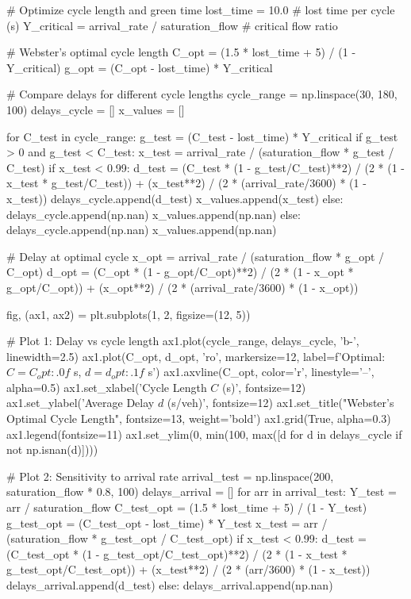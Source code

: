 \documentclass[11pt,a4paper]{article}
\begin{document}
\begin{pycode}
# Optimize cycle length and green time
lost_time = 10.0  # lost time per cycle (s)
Y_critical = arrival_rate / saturation_flow  # critical flow ratio

# Webster's optimal cycle length
C_opt = (1.5 * lost_time + 5) / (1 - Y_critical)
g_opt = (C_opt - lost_time) * Y_critical

# Compare delays for different cycle lengths
cycle_range = np.linspace(30, 180, 100)
delays_cycle = []
x_values = []

for C_test in cycle_range:
    g_test = (C_test - lost_time) * Y_critical
    if g_test > 0 and g_test < C_test:
        x_test = arrival_rate / (saturation_flow * g_test / C_test)
        if x_test < 0.99:
            d_test = (C_test * (1 - g_test/C_test)**2) / (2 * (1 - x_test * g_test/C_test)) + (x_test**2) / (2 * (arrival_rate/3600) * (1 - x_test))
            delays_cycle.append(d_test)
            x_values.append(x_test)
        else:
            delays_cycle.append(np.nan)
            x_values.append(np.nan)
    else:
        delays_cycle.append(np.nan)
        x_values.append(np.nan)

# Delay at optimal cycle
x_opt = arrival_rate / (saturation_flow * g_opt / C_opt)
d_opt = (C_opt * (1 - g_opt/C_opt)**2) / (2 * (1 - x_opt * g_opt/C_opt)) + (x_opt**2) / (2 * (arrival_rate/3600) * (1 - x_opt))

fig, (ax1, ax2) = plt.subplots(1, 2, figsize=(12, 5))

# Plot 1: Delay vs cycle length
ax1.plot(cycle_range, delays_cycle, 'b-', linewidth=2.5)
ax1.plot(C_opt, d_opt, 'ro', markersize=12, label=f'Optimal: $C = {C_opt:.0f}$ s, $d = {d_opt:.1f}$ s')
ax1.axvline(C_opt, color='r', linestyle='--', alpha=0.5)
ax1.set_xlabel('Cycle Length $C$ (s)', fontsize=12)
ax1.set_ylabel('Average Delay $d$ (s/veh)', fontsize=12)
ax1.set_title("Webster's Optimal Cycle Length", fontsize=13, weight='bold')
ax1.grid(True, alpha=0.3)
ax1.legend(fontsize=11)
ax1.set_ylim(0, min(100, max([d for d in delays_cycle if not np.isnan(d)])))

# Plot 2: Sensitivity to arrival rate
arrival_test = np.linspace(200, saturation_flow * 0.8, 100)
delays_arrival = []
for arr in arrival_test:
    Y_test = arr / saturation_flow
    C_test_opt = (1.5 * lost_time + 5) / (1 - Y_test)
    g_test_opt = (C_test_opt - lost_time) * Y_test
    x_test = arr / (saturation_flow * g_test_opt / C_test_opt)
    if x_test < 0.99:
        d_test = (C_test_opt * (1 - g_test_opt/C_test_opt)**2) / (2 * (1 - x_test * g_test_opt/C_test_opt)) + (x_test**2) / (2 * (arr/3600) * (1 - x_test))
        delays_arrival.append(d_test)
    else:
        delays_arrival.append(np.nan)


\end{pycode}
\end{document}

